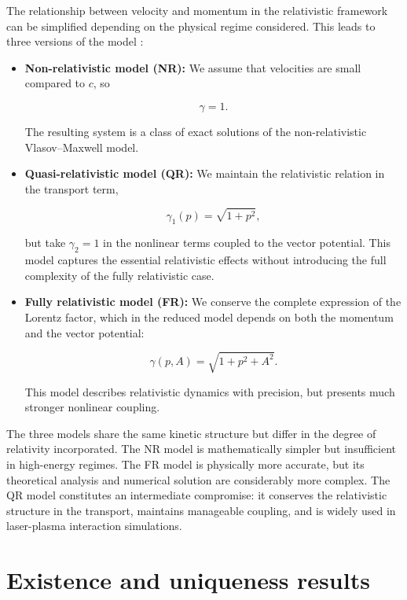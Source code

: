 \documentclass[11pt,a4paper,twoside,pdf]{article}
\numberwithin{equation}{section}
\begin{document}
The relationship between velocity and momentum in the relativistic framework can be simplified depending on the physical regime considered. This leads to three versions of the model \cite{janssen2022gravitacion}:

\begin{itemize}
\item \textbf{Non-relativistic model (NR):}
We assume that velocities are small compared to $c$, so


\[
\gamma = 1.
\]


The resulting system is a class of exact solutions of the non-relativistic Vlasov--Maxwell model.

\item \textbf{Quasi-relativistic model (QR):}
We maintain the relativistic relation in the transport term,


\[
\gamma_1(p)=\sqrt{1+p^2},
\]


but take $\gamma_2=1$ in the nonlinear terms coupled to the vector potential. This model captures the essential relativistic effects without introducing the full complexity of the fully relativistic case.

\item \textbf{Fully relativistic model (FR):}
We conserve the complete expression of the Lorentz factor, which in the reduced model depends on both the momentum and the vector potential:


\[
\gamma(p,A)=\sqrt{1+p^2 + A^2}.
\]


This model describes relativistic dynamics with precision, but presents much stronger nonlinear coupling.
\end{itemize}


The three models share the same kinetic structure but differ in the degree of relativity incorporated. The NR model is mathematically simpler but insufficient in high-energy regimes. The FR model is physically more accurate, but its theoretical analysis and numerical solution are considerably more complex. The QR model constitutes an intermediate compromise: it conserves the relativistic structure in the transport, maintains manageable coupling, and is widely used in laser-plasma interaction simulations.








\section{Existence and uniqueness results}
\end{document}
